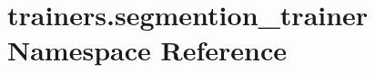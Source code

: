 \hypertarget{namespacetrainers_1_1segmention__trainer}{}\section{trainers.\+segmention\+\_\+trainer Namespace Reference}
\label{namespacetrainers_1_1segmention__trainer}
